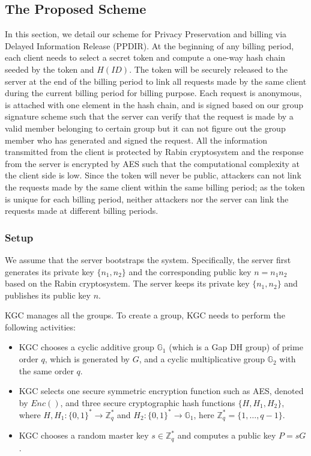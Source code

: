 \documentclass[letterpaper,12pt]{article}
\begin{document}

\subsection{The Proposed Scheme}\label{sec:ProposedScheme}
In this section, we detail our scheme for Privacy Preservation and billing via Delayed Information Release (PPDIR).  At the beginning of any billing period, each client needs to select a secret token and compute a one-way hash chain seeded by the token and $H(ID)$. The token will be securely released to the server at the end of the billing period to link all requests made by the same client during the current billing period for billing purpose. Each request is anonymous, is attached with one element in the hash chain, and is signed based on our group signature scheme such that the server can verify that the request is made by a valid member belonging to certain group but it can not figure out the group member who has generated and signed the request. All the information transmitted from the client is protected by Rabin cryptosystem and the response from the server is encrypted by AES such that the computational complexity at the client side is low. Since the token will never be public, attackers can not link the requests made by the same client within the same billing period; as the token is unique for each billing period, neither attackers nor the server can link the requests made at different billing periods.


\subsubsection {Setup}\label{Sec:setup}

We assume that the server bootstraps the system. Specifically, the server first generates its private key  $\{n_1, n_2\}$ and the corresponding public key $n=n_1n_2$  based on the Rabin cryptosystem. The server keeps its private key $\{n_1, n_2\}$ and publishes its public key $n$.

KGC manages all the groups. To create a group, KGC needs to perform the following activities:
\begin{itemize}
\item KGC chooses a cyclic additive group $\mathbb{G}_1$ (which is a Gap DH group) of prime order $q$, which is generated by $G$, and a cyclic multiplicative group $\mathbb{G}_2$ with the same order $q$.

\item  KGC selects one secure symmetric encryption function such as AES, denoted by $Enc()$, and three secure cryptographic hash functions $\{H, H_1, H_2\}$, where $H, H_1: \{0,1\}^*\longrightarrow \mathbb{Z}_q^{\ast}$ and $H_2: \{0,1\}^*\longrightarrow \mathbb{G}_1$, here $\mathbb{Z}_q^{\ast} = \{1, \ldots, q-1\}$.

\item KGC chooses a random master key $s \in \mathbb{Z}_q^*$ and computes a public key $P=sG$.
\end{itemize}
\end{document}
